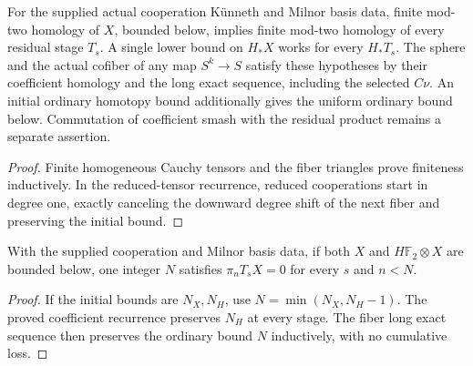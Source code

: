 \begin{proposition}
  \label{prop:adams-tower-homology-finiteness}
  \leanok
  For the supplied actual cooperation K\"unneth and Milnor basis data,
  finite mod-two homology of $X$, bounded below, implies finite mod-two
  homology of every residual stage $T_s$. A single lower bound on
  $H_*X$ works for every $H_*T_s$. The sphere and the actual cofiber of
  any map $S^k\to S$ satisfy these hypotheses by their coefficient
  homology and the long exact sequence, including the selected $C\nu$.
  An initial ordinary homotopy bound additionally gives the uniform
  ordinary bound below. Commutation of coefficient smash with the
  residual product remains a separate assertion.
\end{proposition}
\begin{proof}
  Finite homogeneous Cauchy tensors and the fiber triangles prove
  finiteness inductively. In the reduced-tensor recurrence, reduced
  cooperations start in degree one, exactly canceling the downward
  degree shift of the next fiber and preserving the initial bound.
  \leanok
\end{proof}

\begin{proposition}
  \label{prop:adams-tower-uniform-homotopy-bound}
  \leanok
  With the supplied cooperation and Milnor basis data, if both $X$
  and $H\mathbb F_2\otimes X$ are bounded below, one integer $N$
  satisfies $\pi_nT_sX=0$ for every $s$ and $n<N$.
\end{proposition}
\begin{proof}
  If the initial bounds are $N_X,N_H$, use
  $N=\min(N_X,N_H-1)$. The proved coefficient recurrence preserves
  $N_H$ at every stage. The fiber long exact sequence then preserves
  the ordinary bound $N$ inductively, with no cumulative loss.
  \leanok
\end{proof}

